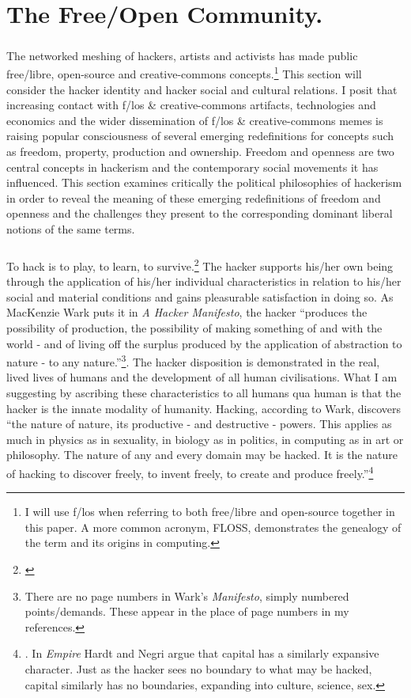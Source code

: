 \newpage
\chapter{The Free/Open Community.}
\paragraph{}The networked meshing of hackers, artists and activists has made public free/libre, open-source and creative-commons concepts.\footnote{I will use f/los when referring to both free/libre and open-source together in this paper. A more common acronym, FLOSS, demonstrates the genealogy of the term and its origins in computing.} This section will consider the hacker identity and hacker social and cultural relations. I posit that increasing contact with f/los \& creative-commons artifacts, technologies and economics and the wider dissemination of f/los \& creative-commons memes is raising popular consciousness of several emerging redefinitions for concepts such as freedom, property, production and ownership. Freedom and openness are two central concepts in hackerism and the contemporary social movements it has influenced. This section examines critically the political philosophies of hackerism in order to reveal the meaning of these emerging redefinitions of freedom and openness and the challenges they present to the corresponding dominant liberal notions of the same terms.

\paragraph{}To hack is to play, to learn, to survive.\footnote{\cite[pp. 48-53 and the prologue `Linus's Law']{himanen:2001he}} The hacker supports his/her own being through the application of his/her individual characteristics in relation to his/her social and material conditions and gains pleasurable satisfaction in doing so. As MacKenzie Wark puts it in \textit{A Hacker Manifesto}, the hacker ``produces the possibility of production, the possibility of making something of and with the world - and of living off the surplus produced by the application of abstraction to nature - to any nature.''\footnote{\cite[077]{wark:2004hm} There are no page numbers in Wark's \textit{Manifesto}, simply numbered points/demands. These appear in the place of page numbers in my references.}. The hacker disposition is demonstrated in the real, lived lives of humans and the development of all human civilisations. What I am suggesting by ascribing these characteristics to all humans qua human is that the hacker is the innate modality of humanity. Hacking, according to Wark, discovers ``the nature of nature, its productive - and destructive - powers. This applies as much in physics as in sexuality, in biology as in politics, in computing as in art or philosophy. The nature of any and every domain may be hacked. It is the nature of hacking to discover freely, to invent freely, to create and produce freely.''\footnote{\cite[076]{wark:2004hm}. In \textit{Empire} Hardt and Negri argue that capital has a similarly expansive character. Just as the hacker sees no boundary to what may be hacked, capital similarly has no boundaries, expanding into culture, science, sex.}

